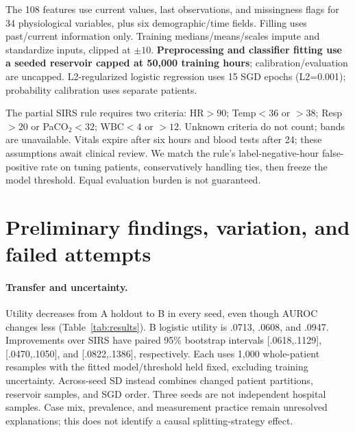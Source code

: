\documentclass{article}
\begin{document}
The 108 features use current values, last observations, and missingness flags for 34 physiological variables, plus six demographic/time fields. Filling uses past/current information only. Training medians/means/scales impute and standardize inputs, clipped at $\pm10$. \textbf{Preprocessing and classifier fitting use a seeded reservoir capped at 50,000 training hours}; calibration/evaluation are uncapped. L2-regularized logistic regression uses 15 SGD epochs (L2=0.001); probability calibration uses separate patients.

The partial SIRS rule requires two criteria: HR$>90$; Temp$<36$ or $>38$; Resp$>20$ or PaCO$_2<32$; WBC$<4$ or $>12$. Unknown criteria do not count; bands are unavailable. Vitals expire after six hours and blood tests after 24; these assumptions await clinical review. We match the rule's label-negative-hour false-positive rate on tuning patients, conservatively handling ties, then freeze the model threshold. Equal evaluation burden is not guaranteed.

\newpage
\section{Preliminary findings, variation, and failed attempts}
\begin{table}[h]
\centering\small

\caption{Means across seeds 7, 42, and 2026; sensitivity is hourly. \emph{Coverage} is the share of hours on which the model gives a prediction rather than abstaining. SD describes variation across fits/splits, \emph{not} a confidence interval. Gated AUROC uses unchanged latent risks on all hours. All B patients and their 761,995 hours are evaluated in every seed.}
\label{tab:results}
\end{table}

\paragraph{Transfer and uncertainty.}
Utility decreases from A holdout to B in every seed, even though AUROC changes less (Table~\ref{tab:results}). B logistic utility is .0713, .0608, and .0947. Improvements over SIRS have paired 95\% bootstrap intervals [.0618,.1129], [.0470,.1050], and [.0822,.1386], respectively. Each uses 1,000 whole-patient resamples with the fitted model/threshold held fixed, excluding training uncertainty. Across-seed SD instead combines changed patient partitions, reservoir samples, and SGD order. Three seeds are not independent hospital samples. Case mix, prevalence, and measurement practice remain unresolved explanations; this does not identify a causal splitting-strategy effect.
\end{document}
